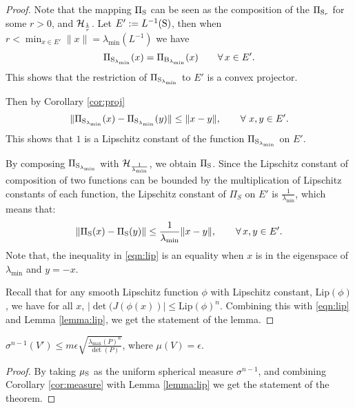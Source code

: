 \begin{proof}
Note that the mapping $\Pi_{\text{S}}$ can be seen as the composition of the $\Pi_{\text{S}_r}$ for some $r > 0$, and $\mathcal{H}_{\frac{1}{r}}$. Let $E':=L^{-1}(\text{S})$, then when $r < \min_{x \in E'}\|x\| = \lambda_{\min}(L^{-1})$ we have
\begin{equation*}\Pi_{\text{S}_{\lambda_{\min}}} (x)= \Pi_{\text{B}_{\lambda_{\min}}}(x) \qquad \forall\, x \in E'.
\end{equation*}
This shows that the restriction of $\Pi_{\text{S}_{\lambda_{\min}}}$ to $E'$ is a convex projector.


Then by Corollary \ref{cor:proj} 
\begin{equation}
\lVert \Pi_{\text{S}_{\lambda_{\min}}}(x) - \Pi_{\text{S}_{\lambda_{\min}}}(y) \rVert \leq \lVert x - y \rVert, \qquad \forall \ x,y \in E'.
\end{equation} 
This shows that $1$ is a Lipschitz constant of the function $\Pi_{\text{S}_{\lambda_{\min}}}$ on $E'$. 

By composing $\Pi_{\text{S}_{\lambda_{\min}}}$ with $\mathcal{H}_{\frac{1}{\lambda_{\min}}}$, we obtain $\Pi_{\text{S}}$. Since the Lipschitz constant of composition of two functions can be bounded by the multiplication of Lipschitz constants of each function, the Lipschitz constant of $\Pi_S$ on $E'$ is $\frac{1}{\lambda_{\min}}$, which means that:
\begin{equation}\label{eqn:lip}
\lVert \Pi_{\text{S}}(x) - \Pi_{\text{S}}(y) \rVert \leq \frac{1}{\lambda_{\min}} \lVert x-y \rVert, \qquad \forall\,x,y \in E'.
\end{equation}
Note that, the inequality in \eqref{eqn:lip} is an equality when $x$ is in the eigenspace of $\lambda_{\min}$ and $y=-x$.

Recall that for any smooth Lipschitz function $\phi$ with Lipschitz constant, Lip$(\phi)$, we have for all $x$, $|\det(J(\phi(x))| \leq \text{Lip}(\phi)^n$. Combining this with  \eqref{eqn:lip} and Lemma \ref{lemma:lip}, we get the statement of the lemma.
\end{proof}

\begin{theorem}$\sigma^{n-1}(V') \leq m\epsilon \sqrt{\frac{\lambda_{\max}(P)^n}{\det(P)}}$,
where $\mu(V) = \epsilon$.
\end{theorem}

\begin{proof}By taking $\mu_{\text{S}}$ as the uniform spherical measure $\sigma^{n-1}$, and combining Corollary \ref{cor:measure} with Lemma \ref{lemma:lip} we get the statement of the theorem.
\end{proof}